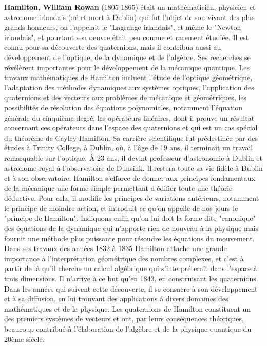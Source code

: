 \textbf{Hamilton, William Rowan} (1805-1865) était un mathématicien, physicien et astronome irlandais (né et mort à Dublin) qui fut l'objet de son vivant des plus grands honneurs, on l'appelait le "Lagrange irlandais", et même le "Newton irlandais", et pourtant son oeuvre était peu connue et rarement étudiée. Il est connu pour sa découverte des quaternions, mais il contribua aussi au développement de l'optique, de la dynamique et de l'algèbre. Ses recherches se révélèrent importantes pour le développement de la mécanique quantique. Les travaux mathématiques de Hamilton incluent l'étude de l'optique géométrique, l'adaptation des méthodes dynamiques aux systèmes optiques, l'application des quaternions et des vecteurs aux problèmes de mécanique et géométriques, les possibilités de résolution des équations polynomiales, notamment l'équation générale du cinquième degré, les opérateurs linéaires, dont il prouve un résultat concernant ces opérateurs dans l'espace des quaternions et qui est un cas spécial du théorème de Cayley-Hamilton. Sa carrière scientifique fut prédestinée par des études à Trinity College, à Dublin, où, à l'âge de 19 ans, il terminait un travail remarquable sur l'optique. À 23 ans, il devint professeur d'astronomie à Dublin et astronome royal à l'observatoire de Dunsink. Il restera toute sa vie fidèle à Dublin et à son observatoire. Hamilton s'efforce de donner aux principes fondamentaux de la mécanique une forme simple permettant d'édifier toute une théorie déductive. Pour cela, il modifie les principes de variations antérieurs, notamment le principe de moindre action, et introduit ce qu'on appelle de nos jours le "principe de Hamilton". Indiquons enfin qu'on lui doit la forme dite "canonique" des équations de la dynamique qui n'apporte rien de nouveau à la physique mais fournit une méthode plus puissante pour résoudre les équations du mouvement. Dans ses travaux des années 1832 à 1835 Hamilton attache une grande importance à l'interprétation géométrique des nombres complexes, et c'est à partir de là qu'il cherche un calcul algébrique qui s'interpréterait dans l'espace à trois dimensions. Il n'arrive à ce but qu'en 1843, en construisant les quaternions. Dans les années qui suivent cette découverte, il se consacre à son développement et à sa diffusion, en lui trouvant des applications à divers domaines des mathématiques et de la physique. Les quaternions de Hamilton constituent un des premiers systèmes de vecteurs et ont, par leurs conséquences théoriques, beaucoup contribué à l'élaboration de l'algèbre et de la physique quantique du 20ème siècle.

